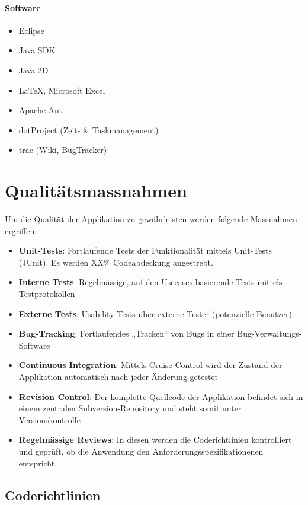 \documentclass[a4paper,12pt,halfparskip,DIV14]{scrartcl}
\begin{document}
\paragraph{Software}
\begin{itemize}
	\item Eclipse
	\item Java SDK
	\item Java 2D
	\item \LaTeX{}, Microsoft Excel
	\item Apache Ant
	\item dotProject (Zeit- \& Taskmanagement)
	\item trac (Wiki, BugTracker)
\end{itemize}


\section{Qualitätsmassnahmen}

Um die Qualität der Applikation zu gewährleisten werden folgende Massnahmen ergriffen:
\begin{itemize}
	\item \textbf{Unit-Tests}: Fortlaufende Tests der Funktionalität mittels Unit-Tests (JUnit). Es werden XX\% Codeabdeckung angestrebt.
	\item \textbf{Interne Tests}: Regelmässige, auf den Usecases basierende Tests mittels Testprotokollen
	\item \textbf{Externe Tests}: Usability-Tests über externe Tester (potenzielle Benutzer)
	\item \textbf{Bug-Tracking}: Fortlaufendes „Tracken“ von Bugs in einer Bug-Verwaltungs-Software
	\item \textbf{Continuous Integration}: Mittels Cruise-Control wird der Zustand der Applikation automatisch nach jeder Änderung getestet
	\item \textbf{Revision Control}: Der komplette Quellcode der Applikation befindet sich in einem zentralen Subversion-Repository und steht somit unter Versionskontrolle
	\item \textbf{Regelmässige Reviews}: In diesen werden die Coderichtlinien kontrolliert und geprüft, ob die Anwendung den Anforderungsspezifikationenen entspricht. 
\end{itemize}

\subsection{Coderichtlinien}\label{sub:coderichtlinien} %
\end{document}
